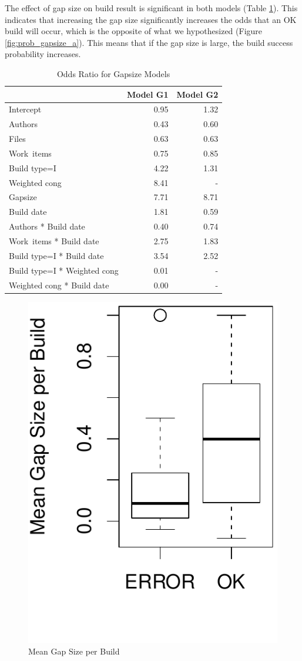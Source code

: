 The effect of gap size on build result is significant in both models (Table \ref{tab:oddsratio_gapsize}). This indicates that increasing the gap size significantly increases the odds that an OK build will occur, which is the opposite of what we hypothesized (Figure \ref{fig:prob_gapsize_a}). This means that if the gap size is large, the build success probability increases.

\begin{table}[t]
\begin{center}
\begin{tabular}{l|rr}
  \hline
 & Model G1 & Model G2 \\ 
  \hline
Intercept & 0.95 & 1.32 \\ 
  Authors & 0.43 & 0.60 \\ 
  Files & 0.63 & 0.63 \\ 
  Work~items & 0.75 & 0.85 \\ 
  Build type=I & 4.22 & 1.31 \\ 
  Weighted cong & 8.41 & - \\ 
  Gapsize & 7.71 & 8.71 \\ 
  Build date & 1.81 & 0.59 \\ 
  Authors * Build date & 0.40 & 0.74 \\ 
  Work~items * Build date & 2.75 & 1.83 \\ 
  Build type=I * Build date & 3.54 & 2.52 \\ 
  Build type=I * Weighted cong & 0.01 & - \\ 
  Weighted cong * Build date & 0.00 & - \\ 
   \hline
\end{tabular}
\caption{Odds Ratio for Gapsize Models}
\label{tab:oddsratio_gapsize}
\end{center}
\end{table}


\begin{figure}[t]
	\centering	
	\includegraphics[width=.5\columnwidth]{figures/boxplot_meangapsize}
	\caption{Mean Gap Size per Build}
	\label{fig:gapsizes}
\end{figure}

